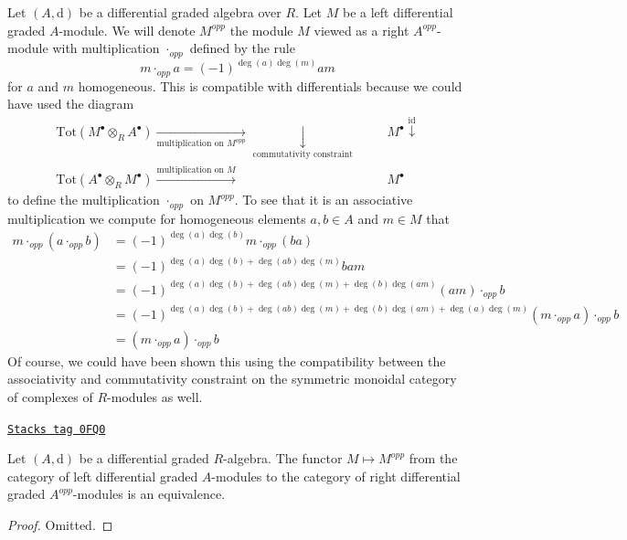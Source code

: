 \medskip\noindent
Let $(A, \text{d})$ be a differential graded algebra over $R$.
Let $M$ be a left differential graded $A$-module. We will denote
$M^{opp}$ the module $M$ viewed as a right $A^{opp}$-module with
multiplication $\cdot_{opp}$ defined by the rule
$$
m \cdot_{opp} a = (-1)^{\deg(a)\deg(m)} a m
$$
for $a$ and $m$ homogeneous. This is compatible with differentials
because we could have used the diagram
$$
\begin{array}{cccc}\text{Tot}(M^\bullet \otimes_R A^\bullet)
\underset{\text{multiplication on }M^{opp}}{\longrightarrow}\underset{\text{commutativity constraint}}{\downarrow} &  &  & M^\bullet \overset{\text{id}}{\downarrow} \\ \text{Tot}(A^\bullet \otimes_R M^\bullet)
\overset{\text{multiplication on }M}{\longrightarrow} &  &  & M^\bullet\end{array}
$$
to define the multiplication $\cdot_{opp}$ on $M^{opp}$.
To see that it is an associative multiplication we compute for
homogeneous elements $a, b \in A$ and $m \in M$ that
\begin{align*}
m \cdot_{opp} (a \cdot_{opp} b)
& =
(-1)^{\deg(a)\deg(b)} m \cdot_{opp} (ba) \\
& =
(-1)^{\deg(a)\deg(b) + \deg(ab)\deg(m)} bam \\
& =
(-1)^{\deg(a)\deg(b) + \deg(ab)\deg(m) + \deg(b)\deg(am)}
(am) \cdot_{opp} b \\
& =
(-1)^{\deg(a)\deg(b) + \deg(ab)\deg(m) + \deg(b)\deg(am) + \deg(a)\deg(m)}
(m \cdot_{opp} a) \cdot_{opp} b \\
& =
(m \cdot_{opp} a) \cdot_{opp} b
\end{align*}
Of course, we could have been shown this using the compatibility between
the associativity and commutativity constraint on the symmetric monoidal
category of complexes of $R$-modules as well.

\begin{lemma}
\label{dga-lemma-left-right}
\href{https://stacks.math.columbia.edu/tag/0FQ0}{\texttt{Stacks tag 0FQ0}}

Let $(A, \text{d})$ be a differential graded $R$-algebra.
The functor $M \mapsto M^{opp}$ from the category of
left differential graded $A$-modules to the category of right
differential graded $A^{opp}$-modules is an equivalence.
\end{lemma}

\begin{proof}
Omitted.
\end{proof}

